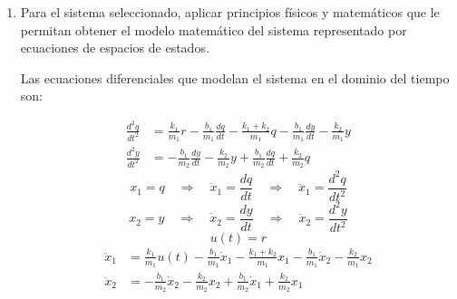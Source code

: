 \documentclass{article}
\begin{document}
\begin{enumerate}
  \item Para el sistema seleccionado, aplicar principios físicos y matemáticos que le permitan obtener el modelo matemático del sistema representado por ecuaciones de espacios de estados.

  Las ecuaciones diferenciales que modelan el sistema en el dominio del tiempo son:

  \begin{align}
    \frac{d^2q}{dt^2} &= \frac{k_1}{m_1}r - \frac{b_1}{m_1}\frac{dq}{dt} - \frac{k_1+k_2}{m_1}q - \frac{b_1}{m_1}\frac{dy}{dt} - \frac{k_2}{m_1}y\\
     \frac{d^2y}{dt^2} &= -\frac{b_1}{m_2}\frac{dy}{dt} - \frac{k_2}{m_2}y + \frac{b_1}{m_2}\frac{dq}{dt} + \frac{k_2}{m_2}q
  \end{align}
  \begin{equation*}
    x_1 = q \quad \Rightarrow \quad \dot{x}_1 = \frac{dq}{dt} \quad \Rightarrow \quad \ddot{x}_1 = \frac{d^2q}{dt^2}
  \end{equation*}
  \begin{equation*}
    x_2 = y \quad \Rightarrow \quad \dot{x}_2 = \frac{dy}{dt} \quad \Rightarrow \quad \ddot{x}_2 = \frac{d^2y}{dt^2}
  \end{equation*}
  \begin{equation*}
    u(t) = r
  \end{equation*}
  \begin{align}
    \ddot{x}_1 &= \frac{k_1}{m_1}u(t) - \frac{b_1}{m_1}\dot{x}_1 - \frac{k_1+k_2}{m_1}x_1 - \frac{b_1}{m_1}\dot{x}_2 - \frac{k_2}{m_1}x_2\\
     \ddot{x}_2 &= -\frac{b_1}{m_2}\dot{x}_2 - \frac{k_2}{m_2}x_2 + \frac{b_1}{m_2}\dot{x}_1 + \frac{k_2}{m_2}x_1
  \end{align}


\end{enumerate}
\end{document}
